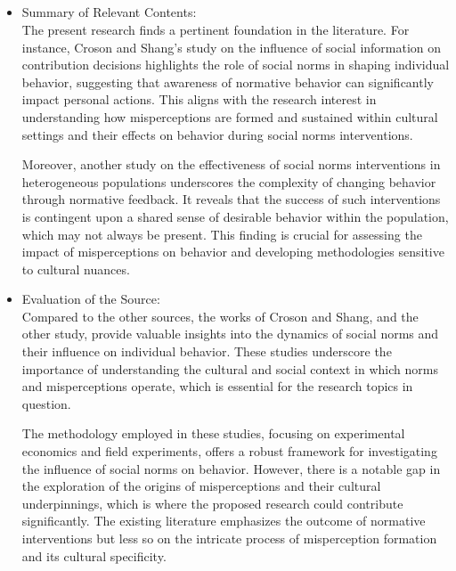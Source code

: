 \documentclass{article}
\begin{document}
\subsection{}
\begin{itemize}
    \item Summary of Relevant Contents:\\
The present research finds a pertinent foundation in the literature. For instance, Croson and Shang's study on the influence of social information on contribution decisions highlights the role of social norms in shaping individual behavior, suggesting that awareness of normative behavior can significantly impact personal actions. This aligns with the research interest in understanding how misperceptions are formed and sustained within cultural settings and their effects on behavior during social norms interventions.

Moreover, another study on the effectiveness of social norms interventions in heterogeneous populations underscores the complexity of changing behavior through normative feedback. It reveals that the success of such interventions is contingent upon a shared sense of desirable behavior within the population, which may not always be present. This finding is crucial for assessing the impact of misperceptions on behavior and developing methodologies sensitive to cultural nuances.
\end{itemize}
\begin{itemize}
    \item Evaluation of the Source:\\
Compared to the other sources, the works of Croson and Shang, and the other study, provide valuable insights into the dynamics of social norms and their influence on individual behavior. These studies underscore the importance of understanding the cultural and social context in which norms and misperceptions operate, which is essential for the research topics in question.

The methodology employed in these studies, focusing on experimental economics and field experiments, offers a robust framework for investigating the influence of social norms on behavior. However, there is a notable gap in the exploration of the origins of misperceptions and their cultural underpinnings, which is where the proposed research could contribute significantly. The existing literature emphasizes the outcome of normative interventions but less so on the intricate process of misperception formation and its cultural specificity.
\end{itemize}
\end{document}
